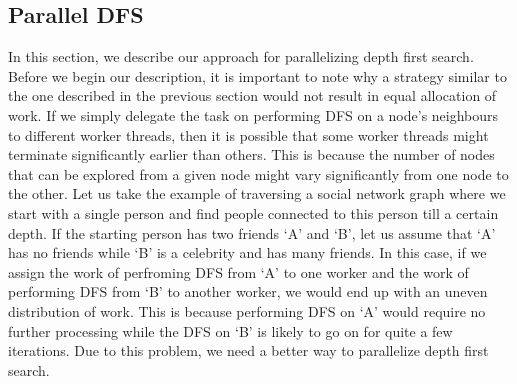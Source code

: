 \subsection{Parallel DFS}
In this section, we describe our approach for parallelizing depth first search.
Before we begin our description, it is important to note why a strategy similar
to the one described in the previous section would not result in equal
allocation of work. If we simply delegate the task on performing DFS on a node's
neighbours to different worker threads, then it is possible that some worker
threads might terminate significantly earlier than others. This is because the
number of nodes that can be explored from a given node might vary significantly
from one node to the other. Let us take the example of traversing a social
network graph where we start with a single person and find people connected to
this person till a certain depth. If the starting person has two friends `A' and
`B', let us assume that `A' has no friends while `B' is a celebrity and has many
friends. In this case, if we assign the work of perfroming DFS from `A' to one
worker and the work of performing DFS from `B' to another worker, we would end
up with an uneven distribution of work. This is because performing DFS on `A'
would require no further processing while the DFS on `B' is likely to go on for
quite a few iterations. Due to this problem, we need a better way to parallelize
depth first search.


